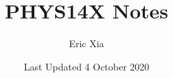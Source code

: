 \documentclass{article}
\title{PHYS14X Notes}
\author{Eric Xia}
\date{Last Updated 4 October 2020}
\begin{document}
    \maketitle
    \tableofcontents
    \pagebreak



    
    
    
    
    
    
\end{document}

